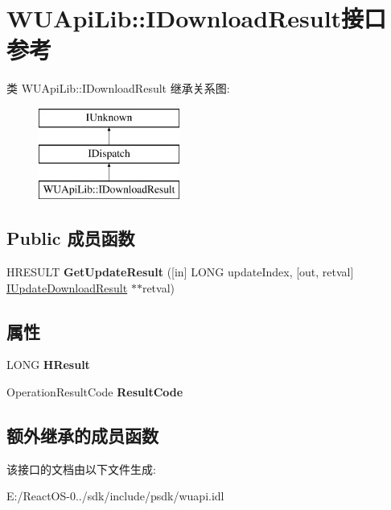 \hypertarget{interface_w_u_api_lib_1_1_i_download_result}{}\section{W\+U\+Api\+Lib\+:\+:I\+Download\+Result接口 参考}
\label{interface_w_u_api_lib_1_1_i_download_result}
类 W\+U\+Api\+Lib\+:\+:I\+Download\+Result 继承关系图\+:\begin{figure}[H]
\begin{center}
\leavevmode
\includegraphics[height=3.000000cm]{interface_w_u_api_lib_1_1_i_download_result}
\end{center}
\end{figure}
\subsection*{Public 成员函数}
\begin{DoxyCompactItemize}
\item 
\mbox{\label{interface_w_u_api_lib_1_1_i_download_result_a4f051045831e4abde8d0cdf6734467b4}} 
H\+R\+E\+S\+U\+LT {\bfseries Get\+Update\+Result} (\mbox{[}in\mbox{]} L\+O\+NG update\+Index, \mbox{[}out, retval\mbox{]} \hyperlink{interface_w_u_api_lib_1_1_i_update_download_result}{I\+Update\+Download\+Result} $\ast$$\ast$retval)
\end{DoxyCompactItemize}
\subsection*{属性}
\begin{DoxyCompactItemize}
\item 
\mbox{\label{interface_w_u_api_lib_1_1_i_download_result_a15ee2adbe42b95ac4e2e3acfe571e4bf}} 
L\+O\+NG {\bfseries H\+Result}
\item 
\mbox{\label{interface_w_u_api_lib_1_1_i_download_result_ab9aff764c8a104f7716d38284fee9bb9}} 
Operation\+Result\+Code {\bfseries Result\+Code}
\end{DoxyCompactItemize}
\subsection*{额外继承的成员函数}


该接口的文档由以下文件生成\+:\begin{DoxyCompactItemize}
\item 
E\+:/\+React\+O\+S-\/0../sdk/include/psdk/wuapi.\+idl\end{DoxyCompactItemize}
